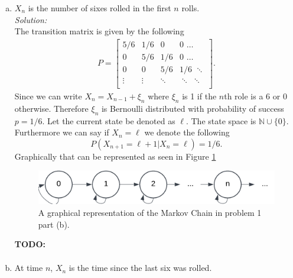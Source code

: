 \documentclass[10pt]{amsart}
\begin{document}
\begin{enumerate}[(a)]
\item $X_n$ is the number of sixes rolled in the first $n$ rolls. \\

\noindent
\textit{Solution:} \\
The transition matrix is given by the following
\begin{align*}
P =
\begin{bmatrix}
5/6 & 1/6 & 0 & 0 \,\, \dots \\
0 & 5/6 & 1/6 & 0 \,\, \dots \\
0 & 0 & 5/6 & 1/6 \,\, \ddots\\
\vdots & \vdots & \ddots & \ddots \,\, \ddots\\
\end{bmatrix}.
\end{align*}
Since we can write $X_n = X_{n - 1} + \xi_n$ where $\xi_n$ is 1 if the $n$th role is a 6 or 0 otherwise.
Therefore $\xi_n$ is Bernoulli distributed with probability of success $p = 1/6$.
Let the current state be denoted as $\ell$.
The state space is $\mathbb N \cup \{0\}$.
Furthermore we can say if $X_n = \ell$ we denote the following
$$
P(X_{n + 1} = \ell + 1 | X_n = \ell) = 1 /6.
$$
Graphically that can be represented as seen in Figure \ref{fig:f2}
\begin{figure}[h]
	\centering
	\includegraphics[scale=0.5]{one_part_b_markov_graph.png}
	\caption{
		A graphical representation of the Markov Chain in problem 1 part (b).
	}\label{fig:f2}
\end{figure}
\textbf{TODO:} \\
\begin{align*}
\end{align*}


\item At time $n$, $X_n$ is the time since the last six was rolled. \\


\end{enumerate}
\end{document}
